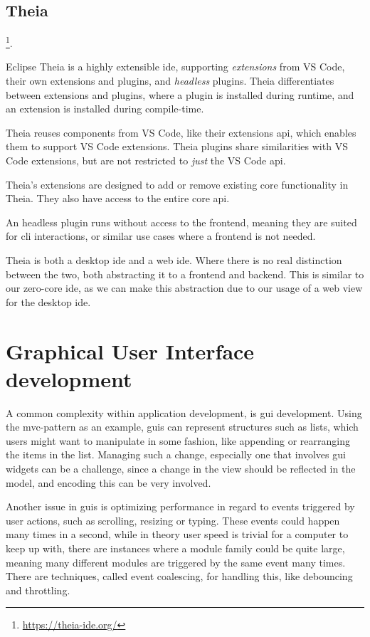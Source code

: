 \subsection{Theia}

\footnote{\url{https://theia-ide.org/}}.

Eclipse Theia is a highly extensible \gls*{ide}, supporting \textit{extensions}
from VS Code, their own extensions and plugins, and \textit{headless} plugins.
Theia differentiates between extensions and plugins, where a plugin is installed
during runtime, and an extension is installed during compile-time.

Theia reuses components from VS Code, like their extensions \gls*{api}, which
enables them to support VS Code extensions. Theia plugins share similarities
with VS Code extensions, but are not restricted to \textit{just} the VS Code
\gls*{api}.

Theia's extensions are designed to add or remove existing core functionality in
Theia. They also have access to the entire core \gls*{api}.

An headless plugin runs without access to the frontend, meaning they are suited
for \gls*{cli} interactions, or similar use cases where a frontend is not
needed.

Theia is both a desktop \gls*{ide} and a web \gls*{ide}. Where there is no real
distinction between the two, both abstracting it to a frontend and backend. This
is similar to our zero-core \gls*{ide}, as we can make this abstraction due to
our usage of a web view for the desktop \gls*{ide}.


\section{Graphical User Interface development} \label{sec:guid}

A common complexity within application development, is \gls*{gui} development.
Using the \gls*{mvc}-pattern as an example, \gls*{gui}s can represent structures
such as lists, which users might want to manipulate in some fashion, like
appending or rearranging the items in the list. Managing such a change,
especially one that involves \gls*{gui} widgets can be a challenge, since a
change in the view should be reflected in the model, and encoding this can be
very involved.

Another issue in \gls*{gui}s is optimizing performance in regard to events
triggered by user actions, such as scrolling, resizing or typing. These events
could happen many times in a second, while in theory user speed is trivial for a
computer to keep up with, there are instances where a module family could be
quite large, meaning many different modules are triggered by the same event many
times. There are techniques, called event coalescing, for handling this, like
debouncing and throttling.

